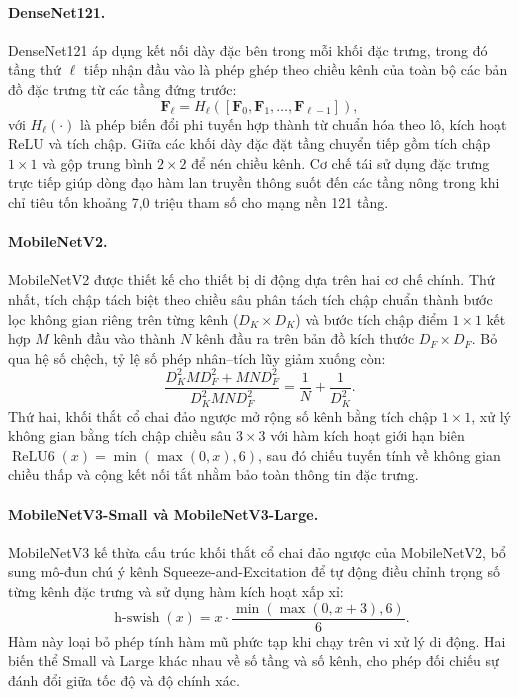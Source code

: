\paragraph{DenseNet121.}
DenseNet121 \cite{huang2017densely} áp dụng kết nối dày đặc bên trong mỗi khối đặc trưng, trong đó tầng thứ $\ell$ tiếp nhận đầu vào là phép ghép theo chiều kênh của toàn bộ các bản đồ đặc trưng từ các tầng đứng trước:
\begin{equation}
    \mathbf{F}_\ell = H_\ell\left([\mathbf{F}_0, \mathbf{F}_1, \dots, \mathbf{F}_{\ell-1}]\right),
    \label{eq:densenet-concat}
\end{equation}
với $H_\ell(\cdot)$ là phép biến đổi phi tuyến hợp thành từ chuẩn hóa theo lô, kích hoạt ReLU và tích chập. Giữa các khối dày đặc đặt tầng chuyển tiếp gồm tích chập $1\times 1$ và gộp trung bình $2\times 2$ để nén chiều kênh. Cơ chế tái sử dụng đặc trưng trực tiếp giúp dòng đạo hàm lan truyền thông suốt đến các tầng nông trong khi chỉ tiêu tốn khoảng 7,0 triệu tham số cho mạng nền 121 tầng.

\paragraph{MobileNetV2.}
MobileNetV2 \cite{sandler2018mobilenetv2} được thiết kế cho thiết bị di động dựa trên hai cơ chế chính. Thứ nhất, tích chập tách biệt theo chiều sâu phân tách tích chập chuẩn thành bước lọc không gian riêng trên từng kênh ($D_K \times D_K$) và bước tích chập điểm $1\times 1$ kết hợp $M$ kênh đầu vào thành $N$ kênh đầu ra trên bản đồ kích thước $D_F \times D_F$. Bỏ qua hệ số chệch, tỷ lệ số phép nhân--tích lũy giảm xuống còn:
\begin{equation}
    \frac{D_K^2 M D_F^2 + M N D_F^2}{D_K^2 M N D_F^2} = \frac{1}{N} + \frac{1}{D_K^2}.
    \label{eq:dw-conv-ratio}
\end{equation}
Thứ hai, khối thắt cổ chai đảo ngược mở rộng số kênh bằng tích chập $1\times 1$, xử lý không gian bằng tích chập chiều sâu $3\times 3$ với hàm kích hoạt giới hạn biên $\operatorname{ReLU6}(x) = \min(\max(0, x), 6)$, sau đó chiếu tuyến tính về không gian chiều thấp và cộng kết nối tắt nhằm bảo toàn thông tin đặc trưng.

\paragraph{MobileNetV3-Small và MobileNetV3-Large.}
MobileNetV3 \cite{howard2019searching} kế thừa cấu trúc khối thắt cổ chai đảo ngược của MobileNetV2, bổ sung mô-đun chú ý kênh Squeeze-and-Excitation để tự động điều chỉnh trọng số từng kênh đặc trưng và sử dụng hàm kích hoạt xấp xỉ:
\begin{equation}
    \operatorname{h-swish}(x) = x \cdot \frac{\min(\max(0, x + 3), 6)}{6}.
    \label{eq:h-swish}
\end{equation}
Hàm này loại bỏ phép tính hàm mũ phức tạp khi chạy trên vi xử lý di động. Hai biến thể Small và Large khác nhau về số tầng và số kênh, cho phép đối chiếu sự đánh đổi giữa tốc độ và độ chính xác.

